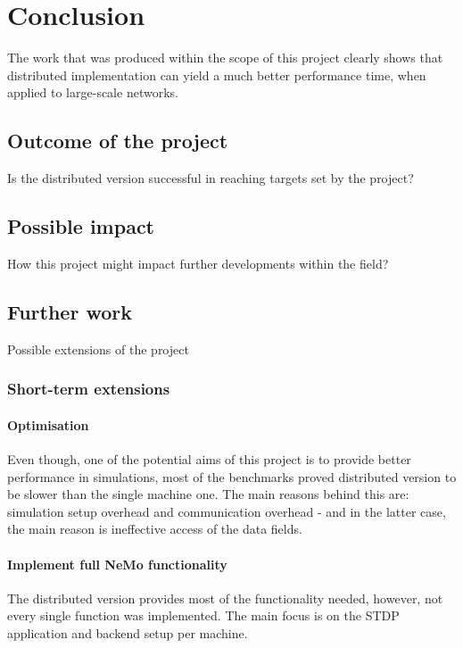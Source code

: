 \chapter{Conclusion}

The work that was produced within the scope of this project clearly shows that distributed implementation can yield a much better performance time, when applied to large-scale networks.

\section{Outcome of the project}

Is the distributed version successful in reaching targets set by the project?

\section{Possible impact}

How this project might impact further developments within the field?

\section{Further work}

Possible extensions of the project

\subsection{Short-term extensions}

\subsubsection{Optimisation}

Even though, one of the potential aims of this project is to provide better performance in simulations, most of the benchmarks proved distributed version to be slower than the single machine one. The main reasons behind this are: simulation setup overhead and communication overhead - and in the latter case, the main reason is ineffective access of the data fields.

\subsubsection{Implement full NeMo functionality}

The distributed version provides most of the functionality needed, however, not every single function was implemented. The main focus is on the STDP application and backend setup per machine.

